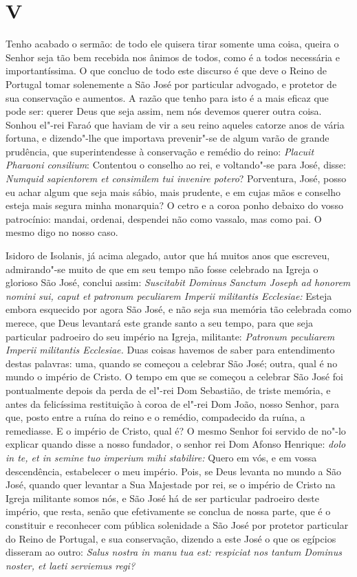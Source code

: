 \section{V}

Tenho acabado o sermão: de todo ele quisera tirar somente uma coisa,
queira o Senhor seja tão bem recebida nos ânimos de todos, como é a
todos necessária e importantíssima. O que concluo de todo este discurso
é que deve o Reino de Portugal tomar solenemente a São José por
particular advogado, e protetor de sua conservação e aumentos. A razão que tenho
para isto é a mais eficaz que pode ser: querer Deus que seja assim, nem
nós devemos querer outra coisa. Sonhou el"-rei Faraó que haviam de vir a
seu reino aqueles catorze anos de vária fortuna, e dizendo"-lhe que
importava prevenir"-se de algum varão de grande prudência, que
superintendesse à conservação e remédio do reino: \emph{Placuit Pharaoni
consilium}: Contentou o conselho ao rei, e voltando"-se
para José, disse: \emph{Numquid sapientorem et consimilem tui invenire
potero}? Porventura, José, posso eu achar algum que seja mais
sábio, mais prudente, e em cujas mãos e conselho esteja mais segura
minha monarquia? O cetro e a coroa ponho debaixo do vosso patrocínio:
mandai, ordenai, despendei não como vassalo, mas como pai. O mesmo digo
no nosso caso.

Isidoro de Isolanis, já acima alegado, autor que há muitos anos que
escreveu, admirando"-se muito de que em seu tempo não fosse celebrado na
Igreja o glorioso São José, conclui assim: \emph{Suscitabit Dominus
Sanctum Joseph ad honorem nomini sui, caput et patronum peculiarem
Imperii militantis Ecclesiae:} Esteja embora esquecido por agora São
José, e não seja sua memória tão celebrada como merece, que Deus
levantará este grande santo a seu tempo, para que seja particular
padroeiro do seu império na Igreja, militante: \emph{Patronum peculiarem
Imperii militantis Ecclesiae.} Duas coisas havemos de saber para
entendimento destas palavras: uma, quando se começou a celebrar São
José; outra, qual é no mundo o império de Cristo. O tempo em que se
começou a celebrar São José foi pontualmente depois da perda de el"-rei
Dom Sebastião, de triste memória, e antes da felicíssima restituição à
coroa de el"-rei Dom João, nosso Senhor, para que, posto entre a ruína do
reino e o remédio, compadecido da ruína, a remediasse. E o império de
Cristo, qual é? O mesmo Senhor foi servido de no"-lo explicar quando
disse a nosso fundador, o senhor rei Dom Afonso Henrique: \emph{dolo in
te, et in semine tuo imperium mihi stabilire:} Quero em vós, e em vossa
descendência, estabelecer o meu império. Pois, se Deus levanta no
mundo a São José, quando quer levantar a Sua Majestade por rei, se o
império de Cristo na Igreja militante somos nós, e São José há de ser
particular padroeiro deste império, que resta, senão que efetivamente se
conclua de nossa parte, que é o constituir e reconhecer com pública
solenidade a São José por protetor particular do Reino de Portugal, e
sua conservação, dizendo a este José o que os egípcios disseram ao
outro: \emph{Salus nostra in manu tua est: respiciat nos tantum Dominus
noster, et laeti serviemus regi?}


